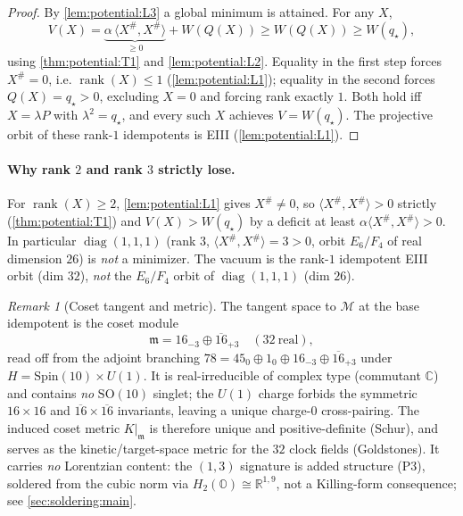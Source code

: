 \documentclass[11pt]{article}
\theoremstyle{plain}
\theoremstyle{definition}
\theoremstyle{remark}
\newtheorem{remark}[theorem]{Remark}
\begin{document}
\begin{proof}
By \autoref{lem:potential:L3} a global minimum is attained. For any $X$,
\begin{equation*}
V(X)=\underbrace{\alpha\,\langle X^\#,X^\#\rangle}_{\ge0}+W(Q(X))\ge W(Q(X))\ge W(q_\star),
\end{equation*}
using \autoref{thm:potential:T1} and \autoref{lem:potential:L2}. Equality in the first step
forces $X^\#=0$, i.e. $\operatorname{rank}(X)\le1$ (\autoref{lem:potential:L1}); equality in
the second forces $Q(X)=q_\star>0$, excluding $X=0$ and forcing rank exactly $1$. Both hold
iff $X=\lambda P$ with $\lambda^2=q_\star$, and every such $X$ achieves $V=W(q_\star)$. The
projective orbit of these rank-$1$ idempotents is EIII (\autoref{lem:potential:L1}).
\end{proof}

\paragraph{Why rank $2$ and rank $3$ strictly lose.}
For $\operatorname{rank}(X)\ge2$, \autoref{lem:potential:L1} gives $X^\#\neq0$, so
$\langle X^\#,X^\#\rangle>0$ strictly (\autoref{thm:potential:T1}) and
$V(X)>W(q_\star)$ by a deficit at least $\alpha\langle X^\#,X^\#\rangle>0$. In particular
$\operatorname{diag}(1,1,1)$ (rank $3$, $\langle X^\#,X^\#\rangle=3>0$, orbit $E_6/F_4$ of
real dimension $26$) is \emph{not} a minimizer. The vacuum is the rank-$1$ idempotent EIII
orbit (dim $32$), \emph{not} the $E_6/F_4$ orbit of $\operatorname{diag}(1,1,1)$ (dim $26$).

\begin{remark}[Coset tangent and metric]
\label{rmk:potential:tangent}
The tangent space to $\mathcal M$ at the base idempotent is the coset module
\begin{equation}
\label{eq:potential:cosettangent}
\mathfrak m=16_{-3}\oplus\overline{16}_{+3}\quad(32\ \text{real}),
\end{equation}
read off from the adjoint branching $78=45_0\oplus1_0\oplus16_{-3}\oplus\overline{16}_{+3}$
under $H=\mathrm{Spin}(10)\times U(1)$. It is real-irreducible of complex type (commutant
$\mathbb C$) and contains \emph{no} $\mathrm{SO}(10)$ singlet; the $U(1)$ charge forbids the
symmetric $16\times16$ and $\overline{16}\times\overline{16}$ invariants, leaving a unique
charge-$0$ cross-pairing. The induced coset metric $K|_{\mathfrak m}$ is therefore unique and
positive-definite (Schur), and serves as the kinetic/target-space metric for the $32$ clock
fields (Goldstones). It carries \emph{no} Lorentzian content: the $(1,3)$ signature is added
structure (P3), soldered from the cubic norm via $H_2(\mathbb O)\cong\mathbb R^{1,9}$, not a
Killing-form consequence; see \autoref{sec:soldering:main}.
\end{remark}
\end{document}

